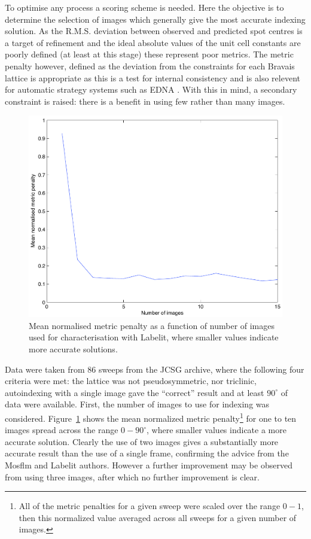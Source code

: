 \documentclass[preprint,pdf]{iucr}
\begin{document}
To optimise any process a scoring scheme is needed. Here the objective
is to determine the selection of images which generally give the most
accurate indexing solution. As the R.M.S. deviation between observed
and predicted spot centres is a target of refinement and the ideal absolute
values of the unit cell constants are poorly defined (at least at this
stage) these represent poor metrics. The metric penalty however,
defined as the deviation from the constraints for each Bravais lattice
\cite{Grosse-Kunstleve:sh5006} is appropriate as this is a test for
internal consistency 
and is also relevent for automatic strategy systems such as EDNA
\cite{Incardona:wa5014}. With this in mind, a secondary constraint is raised:
there is a benefit in using few rather than many images.

\begin{figure}
\caption{Mean normalised metric penalty as a function of number of
  images used for characterisation with Labelit, where smaller values
  indicate more accurate solutions.
\label{figure:no_images}}
\centering
\includegraphics[scale=0.5]{figures/no_images.pdf}
\end{figure}

Data were taken from 86 sweeps from the JCSG archive, where  the
following four
criteria were met: the lattice was not pseudosymmetric, nor triclinic,
autoindexing with a single image gave the ``correct'' result and at
least $90^{\circ}$ of data were available. First, the number of images
to use for indexing was considered. Figure~\ref{figure:no_images}
shows the mean 
normalized metric penalty\footnote{All of the metric penalties for a
  given sweep were scaled over the range $0 - 1$, then this normalized
  value averaged across all sweeps for a given number of images.} for
one to ten images spread across the range $0 - 90^{\circ}$, where
smaller values indicate a more accurate solution. Clearly the use of
two images gives a substantially more accurate result than the use of
a single frame, confirming the advice from the Mosflm and
Labelit authors. However a further improvement may be observed from
using three images, after which no further improvement is clear. 
\end{document}
